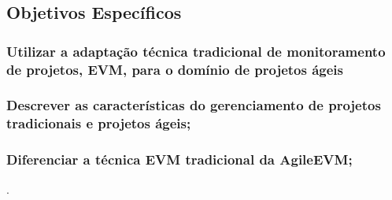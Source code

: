 \subsection{Objetivos Específicos}

\subsubsection{Utilizar a adaptação técnica tradicional de monitoramento de projetos, EVM, para o domínio de projetos ágeis} 

\subsubsection{Descrever as características do gerenciamento de projetos tradicionais e projetos ágeis;} 
\subsubsection{Diferenciar a técnica EVM tradicional da AgileEVM;} .














